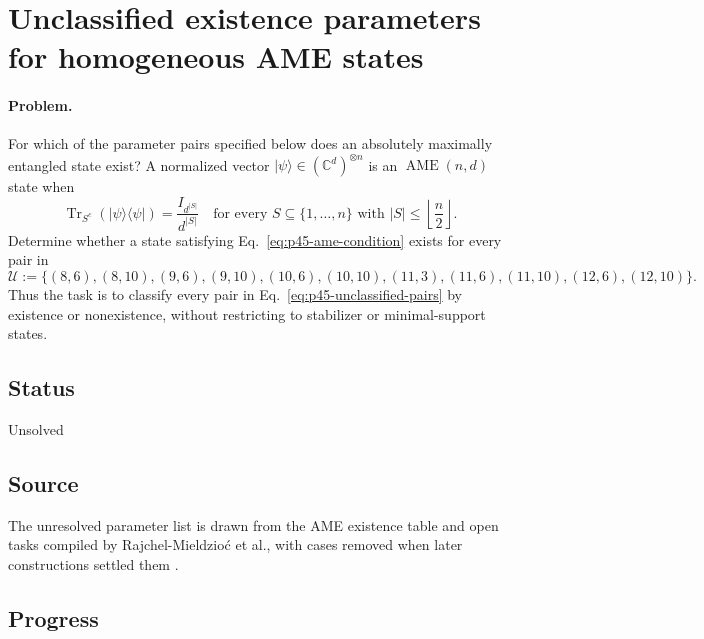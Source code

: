 \section{Unclassified existence parameters for homogeneous AME states}
\label{sec:problem-45}

\paragraph{Problem.}
For which of the parameter pairs specified below does an absolutely maximally
entangled state exist?  A normalized vector
$|\psi\rangle\in(\mathbb C^d)^{\otimes n}$ is an
$\operatorname{AME}(n,d)$ state when
\begin{equation}
  \operatorname{Tr}_{S^c}\!\left(|\psi\rangle\!\langle\psi|\right)
  =\frac{I_{d^{|S|}}}{d^{|S|}}
  \quad\text{for every }S\subseteq\{1,\ldots,n\}
  \text{ with }|S|\leq\left\lfloor\frac n2\right\rfloor.
  \label{eq:p45-ame-condition}
\end{equation}
Determine whether a state satisfying Eq.~\eqref{eq:p45-ame-condition} exists
for every pair in
\begin{equation}
  \mathcal U:=\bigl\{(8,6),(8,10),(9,6),(9,10),(10,6),(10,10),
  (11,3),(11,6),(11,10),(12,6),(12,10)\bigr\}.
  \label{eq:p45-unclassified-pairs}
\end{equation}
Thus the task is to classify every pair in Eq.~\eqref{eq:p45-unclassified-pairs}
by existence or nonexistence, without restricting to stabilizer or
minimal-support states.

\subsection*{Status}

Unsolved

\subsection*{Source}

The unresolved parameter list is drawn from the AME existence table and open
tasks compiled by Rajchel-Mieldzio\'c et al., with cases removed when later
constructions settled them .

\subsection*{Progress}

